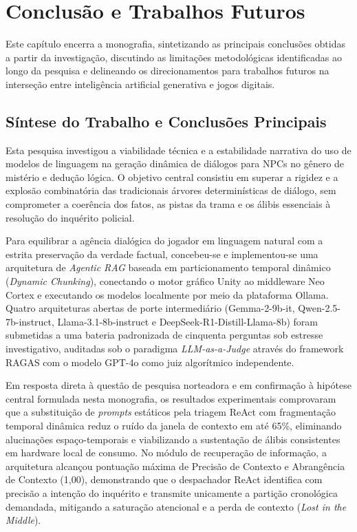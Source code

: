 \chapter{Conclusão e Trabalhos Futuros}
\label{cap:conclusao}

Este capítulo encerra a monografia, sintetizando as principais conclusões obtidas a partir da investigação, discutindo as limitações metodológicas identificadas ao longo da pesquisa e delineando os direcionamentos para trabalhos futuros na interseção entre inteligência artificial generativa e jogos digitais.

\section{Síntese do Trabalho e Conclusões Principais}
\label{sec:concl_sintese}

Esta pesquisa investigou a viabilidade técnica e a estabilidade narrativa do uso de modelos de linguagem na geração dinâmica de diálogos para NPCs no gênero de mistério e dedução lógica. O objetivo central consistiu em superar a rigidez e a explosão combinatória das tradicionais árvores determinísticas de diálogo, sem comprometer a coerência dos fatos, as pistas da trama e os álibis essenciais à resolução do inquérito policial.

Para equilibrar a agência dialógica do jogador em linguagem natural com a estrita preservação da verdade factual, concebeu-se e implementou-se uma arquitetura de \textit{Agentic RAG} baseada em particionamento temporal dinâmico (\textit{Dynamic Chunking}), conectando o motor gráfico Unity ao middleware Neo Cortex e executando os modelos localmente por meio da plataforma Ollama. Quatro arquiteturas abertas de porte intermediário (Gemma-2-9b-it, Qwen-2.5-7b-instruct, Llama-3.1-8b-instruct e DeepSeek-R1-Distill-Llama-8b) foram submetidas a uma bateria padronizada de cinquenta perguntas sob estresse investigativo, auditadas sob o paradigma \textit{LLM-as-a-Judge} através do framework RAGAS com o modelo GPT-4o como juiz algorítmico independente.

Em resposta direta à questão de pesquisa norteadora e em confirmação à hipótese central formulada nesta monografia, os resultados experimentais comprovaram que a substituição de \textit{prompts} estáticos pela triagem ReAct com fragmentação temporal dinâmica reduz o ruído da janela de contexto em até 65\%, eliminando alucinações espaço-temporais e viabilizando a sustentação de álibis consistentes em hardware local de consumo. No módulo de recuperação de informação, a arquitetura alcançou pontuação máxima de Precisão de Contexto e Abrangência de Contexto (1,00), demonstrando que o despachador ReAct identifica com precisão a intenção do inquérito e transmite unicamente a partição cronológica demandada, mitigando a saturação atencional e a perda de contexto (\textit{Lost in the Middle}).

